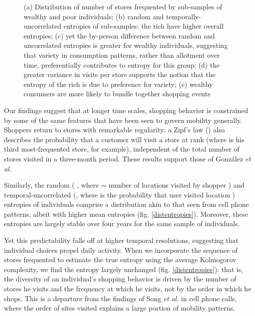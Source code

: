 \documentclass[twocolumn,floatfix]{revtex4}
\begin{document}
\begin{figure*}[!ht]
\centering
{}
\newline
{}
\caption{(a) Distribution of number of stores frequented by sub-samples of wealthy and poor individuals; (b) random and temporally-uncorrelated entropies of sub-samples: the rich have higher overall entropies; (c) yet the by-person difference between random and uncorrelated entropies is greater for wealthy individuals, suggesting that variety in consumption patterns, rather than allotment over time, preferentially contributes to entropy for this group; (d) the greater variance in visits per store supports the notion that the entropy of the rich is due to preference for variety; (e) wealthy consumers are more likely to bundle together shopping events }
\label{decomposition}
\end{figure*}

Our findings suggest that at longer time scales, shopping behavior is constrained by some of the same features that have been seen to govern mobility generally. Shoppers return to stores with remarkable regularity: a Zipf's law () also describes the probability that a customer will visit a store at rank  (where  is his third most-frequented store, for example), independent of the total number of stores visited in a three-month period. These results support those of Gonz\'alez {\it et al.}


Similarly, the random ( , where   = number of locations visited by shopper ) and temporal-uncorrelated (, where  is the probability that user  visited location ) entropies of individuals comprise a distribution akin to that seen from cell phone patterns, albeit with higher mean entropies (fig. \ref{distentropies}). Moreover, these entropies are largely stable over four years for the same sample of individuals.




Yet this predictability falls off at higher temporal resolutions, suggesting that individual choices propel daily activity. When we incorporate the sequence of stores frequented to estimate the true entropy using the average Kolmogorov complexity, we find the entropy largely unchanged (fig. \ref{distentropies}): that is, the diversity of an individual's shopping behavior is driven by the number of stores he visits and the frequency at which he visits, not by the order in which he shops. This is a departure from the findings of Song {\it et al.}  in cell phone calls, where the order of sites visited explains a large portion of mobility patterns. 
\end{document}
